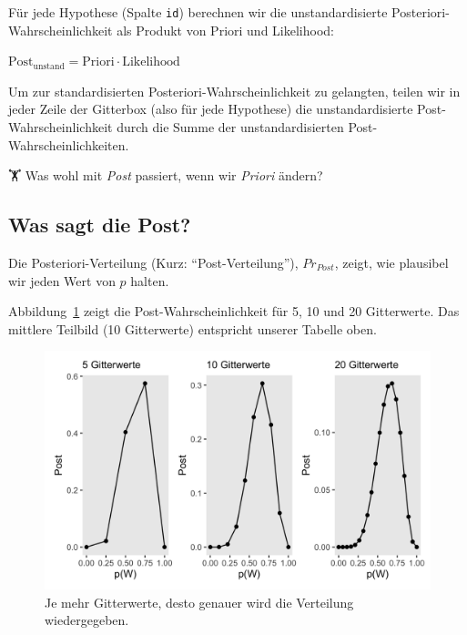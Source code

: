 \documentclass[
  a4paper,
  DIV=11]{scrreprt}
\theoremstyle{definition}
\theoremstyle{remark}
\begin{document}
Für jede Hypothese (Spalte \texttt{id}) berechnen wir die
unstandardisierte Posteriori-Wahrscheinlichkeit als Produkt von Priori
und Likelihood:

\(\text{Post}_{\text{unstand}} = \text{Priori} \cdot \text{Likelihood}\)

Um zur standardisierten Posteriori-Wahrscheinlichkeit zu gelangten,
teilen wir in jeder Zeile der Gitterbox (also für jede Hypothese) die
unstandardisierte Post-Wahrscheinlichkeit durch die Summe der
unstandardisierten Post-Wahrscheinlichkeiten.

🏋️ Was wohl mit \emph{Post} passiert, wenn wir \emph{Priori} ändern?

\hypertarget{was-sagt-die-post}{%
\subsection{Was sagt die Post?}\label{was-sagt-die-post}}

Die Posteriori-Verteilung (Kurz: ``Post-Verteilung''), \(Pr_{Post}\),
zeigt, wie plausibel wir jeden Wert von \(p\) halten.

Abbildung~\ref{fig-gitter} zeigt die Post-Wahrscheinlichkeit für 5, 10
und 20 Gitterwerte. Das mittlere Teilbild (10 Gitterwerte) entspricht
unserer Tabelle oben.

\begin{figure}

{\centering \includegraphics{./img/img242.png}

}

\caption{\label{fig-gitter}Je mehr Gitterwerte, desto genauer wird die
Verteilung wiedergegeben.}

\end{figure}
\end{document}

